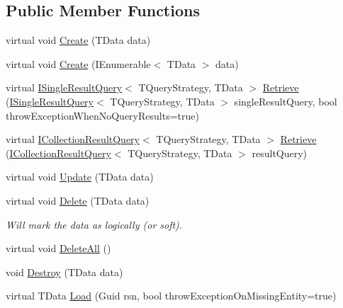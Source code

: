 \subsection*{Public Member Functions}
\begin{DoxyCompactItemize}
\item 
virtual void \hyperlink{classCqrs_1_1Repositories_1_1Repository_a5d5d78262533aa2ab32eddbab83869bd}{Create} (T\+Data data)
\item 
virtual void \hyperlink{classCqrs_1_1Repositories_1_1Repository_a2af8103cc2946317f8ee9ede643bbc68}{Create} (I\+Enumerable$<$ T\+Data $>$ data)
\item 
virtual \hyperlink{interfaceCqrs_1_1Repositories_1_1Queries_1_1ISingleResultQuery}{I\+Single\+Result\+Query}$<$ T\+Query\+Strategy, T\+Data $>$ \hyperlink{classCqrs_1_1Repositories_1_1Repository_a4f83093a92d8141cdc2b908bbbd97f32}{Retrieve} (\hyperlink{interfaceCqrs_1_1Repositories_1_1Queries_1_1ISingleResultQuery}{I\+Single\+Result\+Query}$<$ T\+Query\+Strategy, T\+Data $>$ single\+Result\+Query, bool throw\+Exception\+When\+No\+Query\+Results=true)
\item 
virtual \hyperlink{interfaceCqrs_1_1Repositories_1_1Queries_1_1ICollectionResultQuery}{I\+Collection\+Result\+Query}$<$ T\+Query\+Strategy, T\+Data $>$ \hyperlink{classCqrs_1_1Repositories_1_1Repository_ab1136a454f981848d49e0d0a2f4b6a2f}{Retrieve} (\hyperlink{interfaceCqrs_1_1Repositories_1_1Queries_1_1ICollectionResultQuery}{I\+Collection\+Result\+Query}$<$ T\+Query\+Strategy, T\+Data $>$ result\+Query)
\item 
virtual void \hyperlink{classCqrs_1_1Repositories_1_1Repository_a893276506e64034992d2c29d5ef11100}{Update} (T\+Data data)
\item 
virtual void \hyperlink{classCqrs_1_1Repositories_1_1Repository_ac9d88baa6afcea85553fd233ba406e48}{Delete} (T\+Data data)
\begin{DoxyCompactList}\small\item\em Will mark the {\itshape data}  as logically (or soft). \end{DoxyCompactList}\item 
virtual void \hyperlink{classCqrs_1_1Repositories_1_1Repository_a6b6b50d476a351fc7fbd194cb8fa44d0}{Delete\+All} ()
\item 
void \hyperlink{classCqrs_1_1Repositories_1_1Repository_a6ed69cb5542164d9de81b0fa8a549d3e}{Destroy} (T\+Data data)
\item 
virtual T\+Data \hyperlink{classCqrs_1_1Repositories_1_1Repository_a444e9dfe4710be90940dbb6dec9d856f}{Load} (Guid rsn, bool throw\+Exception\+On\+Missing\+Entity=true)
\end{DoxyCompactItemize}
